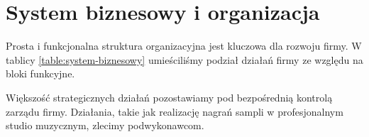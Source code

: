 \documentclass[12pt]{article}
\begin{document}
\section{System biznesowy i organizacja}


Prosta i funkcjonalna struktura organizacyjna jest kluczowa dla rozwoju firmy.
W tablicy \ref{table:system-biznesowy} umieściliśmy podział działań firmy ze względu na bloki funkcyjne.

Większość strategicznych działań pozostawiamy pod bezpośrednią kontrolą zarządu firmy.
Działania, takie jak realizację nagrań sampli w profesjonalnym studio muzycznym, zlecimy podwykonawcom.
\end{document}
